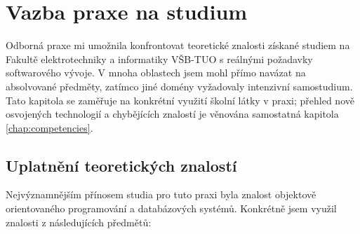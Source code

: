 \chapter{Vazba praxe na studium}
\label{chap:studies_connection}

Odborná praxe mi umožnila konfrontovat teoretické znalosti získané studiem na Fakultě elektrotechniky a informatiky VŠB-TUO s reálnými požadavky softwarového vývoje. V mnoha oblastech jsem mohl přímo navázat na absolvované předměty, zatímco jiné domény vyžadovaly intenzivní samostudium. Tato kapitola se zaměřuje na konkrétní využití školní látky v praxi; přehled nově osvojených technologií a chybějících znalostí je věnována samostatná kapitola \ref{chap:competencies}.

\section{Uplatnění teoretických znalostí}

Nejvýznamnějším přínosem studia pro tuto praxi byla znalost objektově orientovaného programování a databázových systémů. Konkrétně jsem využil znalosti z následujících předmětů:


